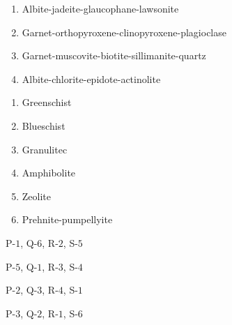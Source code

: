 \documentclass[journal,12pt,onecolumn]{IEEEtran}
\theoremstyle{remark}
\begin{document}
\begin{enumerate}
    \begin{multicols}{2}
            \begin{enumerate}[start = 16]
                \item Albite-jadeite-glaucophane-lawsonite
                \item Garnet-orthopyroxene-clinopyroxene-plagioclase
                \item Garnet-muscovite-biotite-sillimanite-quartz
                \item Albite-chlorite-epidote-actinolite
            \end{enumerate}
            
            \columnbreak
            
            \begin{enumerate} 
                \item Greenschist
                \item Blueschist
                \item Granulitec
                \item Amphibolite
                \item Zeolite
                \item Prehnite-pumpellyite
            \end{enumerate}         


        \end{multicols}
            \begin {enumerate}
                \begin{multicols}{2}
                    \item P-$1$, Q-$6$, R-$2$, S-$5$
                    \item P-$5$, Q-$1$, R-$3$, S-$4$
                    \item P-$2$, Q-$3$, R-$4$, S-$1$
                    \item P-$3$, Q-$2$, R-$1$, S-$6$


\end{multicols}
\end{enumerate}
\end{enumerate}
\end{document}

